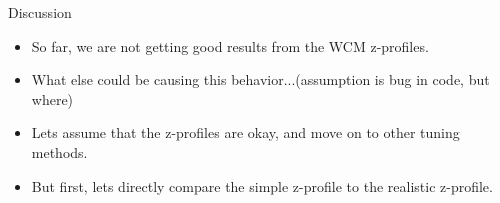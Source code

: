 \begin{frame}{Discussion}
	\begin{itemize}
		\item So far, we are not getting good results from the WCM z-profiles.
		\item What else could be causing this behavior...(assumption is bug in code,
			but where)
		\item Lets assume that the z-profiles are okay, and move on to other tuning
			methods.
		\item But first, lets directly compare the simple z-profile to the
			realistic z-profile.
	\end{itemize}
\end{frame}
